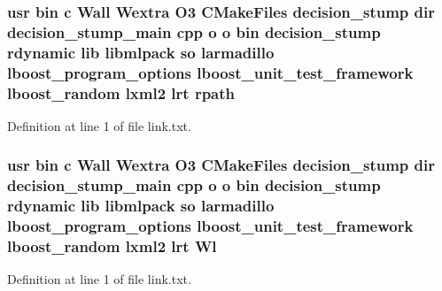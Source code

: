 \subsubsection[{rpath}]{\setlength{\rightskip}{0pt plus 5cm}usr bin c Wall Wextra O3 C\-Make\-Files decision\-\_\-stump dir decision\-\_\-stump\-\_\-main cpp o o bin decision\-\_\-stump rdynamic lib libmlpack so larmadillo lboost\-\_\-program\-\_\-options lboost\-\_\-unit\-\_\-test\-\_\-framework lboost\-\_\-random lxml2 lrt rpath}\label{methods_2decision__stump_2CMakeFiles_2decision__stump_8dir_2link_8txt_ac455a94b99c8dc03f19d567023256d77}


Definition at line 1 of file link.\-txt.

\subsubsection[{Wl}]{\setlength{\rightskip}{0pt plus 5cm}usr bin c Wall Wextra O3 C\-Make\-Files decision\-\_\-stump dir decision\-\_\-stump\-\_\-main cpp o o bin decision\-\_\-stump rdynamic lib libmlpack so larmadillo lboost\-\_\-program\-\_\-options lboost\-\_\-unit\-\_\-test\-\_\-framework lboost\-\_\-random lxml2 lrt Wl}\label{methods_2decision__stump_2CMakeFiles_2decision__stump_8dir_2link_8txt_a7855ee953bb457db732f2a49faff7f26}


Definition at line 1 of file link.\-txt.

